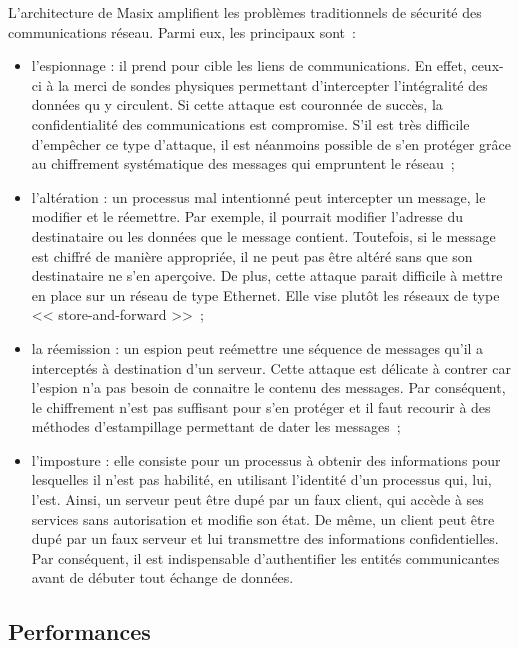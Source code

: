 L'architecture de Masix amplifient les probl\`emes traditionnels 
de s\'ecurit\'e des communications r\'eseau. 
Parmi eux, les principaux sont~:
\begin{itemize}

\item l'espionnage : il prend pour cible les liens de com\-munications. En effet, ceux-ci \`a la merci de sondes physiques permettant d'intercepter l'int\'egralit\'e des donn\'ees qu y circulent. Si cette attaque est couronn\'ee de succ\`es, la confidentialit\'e des communications est compromise.
S'il est tr\`es difficile d'emp\^echer ce
type d'attaque, il est n\'eanmoins possible de s'en prot\'eger gr\^ace au
chiffrement syst\'ematique des messages qui empruntent le r\'eseau~;

\item l'alt\'eration : un processus mal intentionn\'e peut intercepter un message, le modifier et le r\'eemettre. Par exemple, il pourrait modifier l'adresse du destinataire ou les donn\'ees que le message contient. Toutefois, si le 
message est chiffr\'e de mani\`ere appropri\'ee, il ne peut pas \^etre alt\'er\'e sans que son destinataire ne s'en aper\c{c}oive. De plus, cette attaque parait difficile \`a mettre en place sur un r\'eseau de type Ethernet. Elle vise 
plut\^ot les r\'eseaux de type << store-and-forward >>~;

\item la r\'eemission : un espion peut re\'emettre une s\'equence de messages qu'il a intercept\'es \`a destination d'un serveur. Cette attaque est d\'elicate \`a contrer car l'espion n'a pas besoin de connaitre le contenu des messages. Par cons\'equent, le chiffrement n'est pas suffisant pour s'en prot\'eger et il faut recourir \`a des m\'ethodes d'estampillage permettant de dater les messages~;

\item l'imposture : elle consiste pour un processus 
\`a obtenir des informations pour lesquelles il n'est pas habilit\'e, en utilisant l'identit\'e d'un processus qui, lui, l'est. Ainsi, un serveur peut \^etre dup\'e par un faux client, qui acc\`ede \`a ses services sans autorisation et modifie son \'etat. De m\^eme, un client peut \^etre dup\'e par un faux serveur et 
lui transmettre des informations confidentielles. 
Par cons\'equent, il est indispensable d'authentifier les entit\'es communicantes avant de d\'ebuter tout \'echange de donn\'ees.
\end{itemize}

\subsection{Performances}

